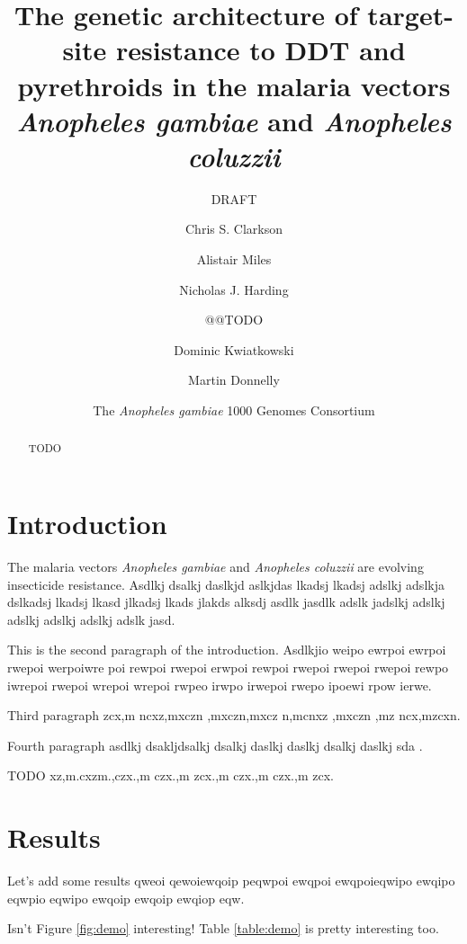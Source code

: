 \documentclass[a4paper,10pt,abstracton]{scrartcl}
\title{
The genetic architecture of target-site resistance to DDT and pyrethroids in the malaria vectors \emph{Anopheles gambiae} and \emph{Anopheles coluzzii}
}
\subtitle{DRAFT}
\author[1]{Chris S. Clarkson}
\author[2,1]{Alistair Miles}
\author[2]{Nicholas J. Harding}
\author{@@TODO}
\author[1,2]{Dominic Kwiatkowski}
\author[3,1]{Martin Donnelly}
\author[4]{The \emph{Anopheles gambiae} 1000 Genomes Consortium}
\affil[1]{Sanger @@TODO}
\affil[2]{Oxford @@TODO}
\affil[3]{Liverpool @@TODO}
\affil[4]{MalariaGEN @@TODO}
\begin{document}
\maketitle

\begin{abstract}

TODO

\end{abstract}

\section*{Introduction}

The malaria vectors \emph{Anopheles gambiae} and \emph{Anopheles coluzzii} are evolving insecticide resistance.
%
Asdlkj dsalkj daslkjd aslkjdas lkadsj lkadsj adslkj adslkja dslkadsj lkadsj lkasd jlkadsj lkads jlakds alksdj asdlk jasdlk adslk jadslkj adslkj adslkj adslkj adslkj adslk jasd.

This is the second paragraph of the introduction.
%
Asdlkjio weipo ewrpoi ewrpoi rwepoi werpoiwre poi rewpoi rwepoi erwpoi rewpoi rwepoi rwepoi rwepoi rewpo iwrepoi rwepoi wrepoi wrepoi rwpeo irwpo irwepoi rwepo ipoewi rpow ierwe.

Third paragraph zcx,m ncxz,mxczn ,mxczn,mxcz n,mcnxz ,mxczn ,mz ncx,mzcxn.

Fourth paragraph asdlkj dsakljdsalkj dsalkj daslkj daslkj dsalkj daslkj sda \cite{Garud2015}.

TODO xz,m.cxzm.,czx.,m czx.,m zcx.,m czx.,m czx.,m zcx.

\section*{Results}

Let's add some results qweoi qewoiewqoip peqwpoi ewqpoi ewqpoieqwipo ewqipo eqwpio eqwipo ewqoip ewqoip ewqiop eqw.

Isn't Figure \ref{fig:demo} interesting! 
%
Table \ref{table:demo} is pretty interesting too.

\begin{landscape}
\begin{table}[h]
  \small
  \centering
  
  \caption{
\textbf{Non-synonymous mutations in the voltage-gated sodium channel gene}. 
%
All mutations are at 5\% frequency or above in one or more of the 9 Ag1000G phase 1 populations, with the exception of \texttt{2,400,071 G>T} which is only found in the CM\emph{Ag} population at 0.4\% frequency but is included because another mutation (\texttt{2,400,071 G>A}) is found at the same position causing the same amino acid substitution (\texttt{M490I}). 
%
Substitutions marked with an asterisk (*) failed conservative variant filters applied genome-wide in the Ag1000G phase 1 AR3 callset, but appeared sound on manual inspection of read alignments.
}
  \label{table:variants_missense}
\end{table}
\end{landscape}
\end{document}
